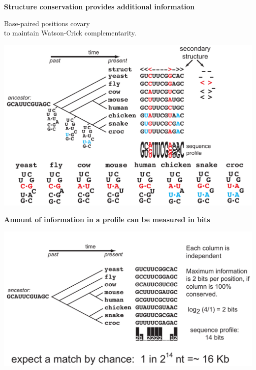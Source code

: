 \documentclass[landscape]{slides}
\begin{document}
\begin{slide}
\begin{center}
\textbf{Structure conservation provides additional information}
\medskip

Base-paired positions covary \\ to maintain Watson-Crick complementarity.

\includegraphics[width=10in]{figs/seqstructprofiles-struct2}
\end{center}

\vfill
\end{slide}
\begin{slide}
\begin{center}
\textbf{Amount of information in a profile can be measured in bits}
\medskip

\includegraphics[width=9in]{figs/seqstructprofiles-2014-seqinfo}
\end{center}

\vfill
\end{slide}
\end{document}
